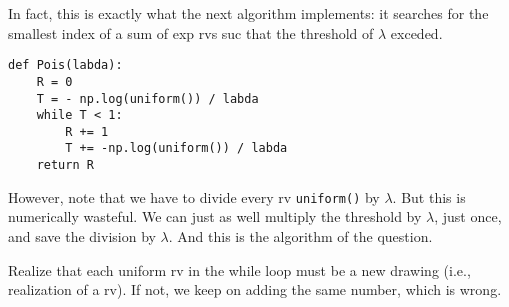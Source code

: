 \documentclass[stochastic-or.tex]{subfiles}
\begin{document}
\begin{truefalse}
\begin{solution}
In fact, this is exactly what the next algorithm implements: it searches for the smallest index of a sum of exp rvs suc that the threshold of $\lambda$ exceded.
\begin{verbatim}
def Pois(labda):
    R = 0
    T = - np.log(uniform()) / labda
    while T < 1:
        R += 1
        T += -np.log(uniform()) / labda
    return R
\end{verbatim}
However, note that we have to divide every rv \texttt{uniform()} by $\lambda$. But this is numerically wasteful. We can just as well multiply the threshold by $\lambda$, just once, and save the division by $\lambda$. And this is the algorithm of the question.

Realize that each uniform rv in the while loop must be a new drawing (i.e., realization of a rv). If not, we keep on adding the same number, which is wrong.
\end{solution}
\end{truefalse}


\end{document}
